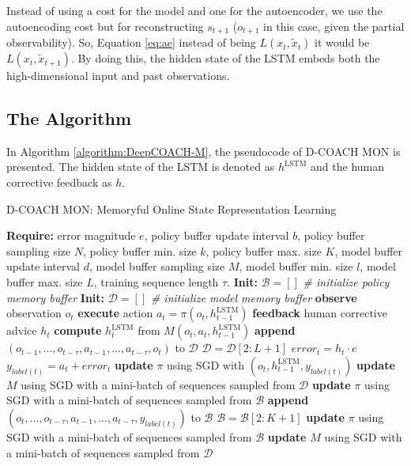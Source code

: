 Instead of using a cost for the model and one for the autoencoder, we use the autoencoding cost but for reconstructing $s_{t+1}$ ($o_{t+1}$ in this case, given the partial observability). So, Equation \ref{eq:ae} instead of being $L(x_{t},\widetilde x_{t})$ it would be  $L(x_{t},\widetilde x_{t+1})$. By doing this, the hidden state of the LSTM embeds both the high-dimensional input and past observations.
\newpage

\subsection{The Algorithm}

In Algorithm \ref{algorithm:DeepCOACH-M}, the pseudocode of D-COACH MON is presented. The hidden state of the LSTM is denoted as  $h^{\mathrm{LSTM}}$ and the human corrective feedback as  $h$.

\begin{algorithm}[h]
\caption{D-COACH MON: Memoryful Online State Representation Learning}\label{algorithm:DeepCOACH-M}
\begin{algorithmic}[1]
\State \textbf{Require:} error magnitude $e$, policy buffer update interval $b$, policy buffer sampling size $N$, policy buffer min. size $k$, policy buffer max. size $K$, model buffer update interval $d$, model buffer sampling size $M$, model buffer min. size $l$, model buffer max. size $L$, training sequence length $\tau$.
\State \textbf{Init:} $\mathcal{B} = []$  \emph{\# initialize policy memory buffer}
\State \textbf{Init:} $\mathcal{D} = []$  \emph{\# initialize model memory buffer}
\State \textbf{observe} observation $o_{t}$
\State \textbf{execute} action $a_{t}=\pi(o_{t}, h^{\mathrm{LSTM}}_{t-1})$
\State \textbf{feedback} human corrective advice $h_{t}$
\State \textbf{compute} $h^{\mathrm{LSTM}}_{t}$ from $M(o_{t}, a_{t},h^{\mathrm{LSTM}}_{t-1})$
\State \textbf{append} $(o_{t-1},...,o_{t-\tau},a_{t-1},...,a_{t-\tau},o_{t})$ to $\mathcal{D}$
\State $\mathcal{D} = \mathcal{D}[2:L+1]$
\EndIf
{}
\State $\mathit{error}_{t} = h_{t}\cdot e$
\State $y_{label(t)} = a_{t} + \mathit{error}_{t}$ 
\State \textbf{update} $\pi$ using SGD with $(o_{t}, h^{\mathrm{LSTM}}_{t-1}, y_{\mathit{label}(t)})$ 
\State \textbf{update} $M$ using SGD with a mini-batch of sequences sampled from $\mathcal{D}$
\State \textbf{update} $\pi$ using SGD with a mini-batch of sequences sampled from $\mathcal{B}$
\State \textbf{append} $(o_{t},...,o_{t-\tau},a_{t-1},...,a_{t-\tau}, y_{\mathit{label}(t)})$ to $\mathcal{B}$
\State $\mathcal{B} = \mathcal{B}[2:K+1]$
\EndIf
\EndIf
{}
\State \textbf{update} $\pi$ using SGD with a mini-batch of sequences sampled from $\mathcal{B}$
\EndIf
{}
\State \textbf{update} $M$ using SGD with a mini-batch of sequences sampled from $\mathcal{D}$
\EndIf
\EndFor
\end{algorithmic}
\end{algorithm}



